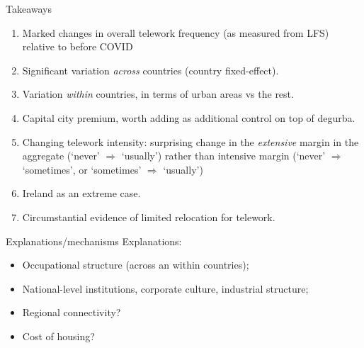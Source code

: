 \documentclass[10pt]{beamer}
\begin{document}
\begin{frame}{Takeaways}

\begin{enumerate}
\item Marked changes in overall telework frequency (as measured from LFS) relative to before COVID
\item Significant variation \emph{across} countries (country fixed-effect).
\item Variation \emph{within} countries, in terms of urban areas vs the rest.
\item Capital city premium, worth adding as additional control on top of degurba.
\item Changing telework intensity: surprising change in the \emph{extensive} margin in the aggregate (`never' $\Rightarrow$ `usually') rather than intensive margin (`never' $\Rightarrow$ `sometimes', or `sometimes' $\Rightarrow$ `usually')
\item Ireland as an extreme case.
\item Circumstantial evidence of limited relocation for telework.
\end{enumerate}

\end{frame}

\begin{frame}{Explanations/mechanisms}
Explanations:
\begin{itemize}
  \item Occupational structure (across an within countries);
  \item National-level institutions, corporate culture, industrial structure;
  \item Regional connectivity?
  \item Cost of housing?
\end{itemize}
\end{frame}
\end{document}

